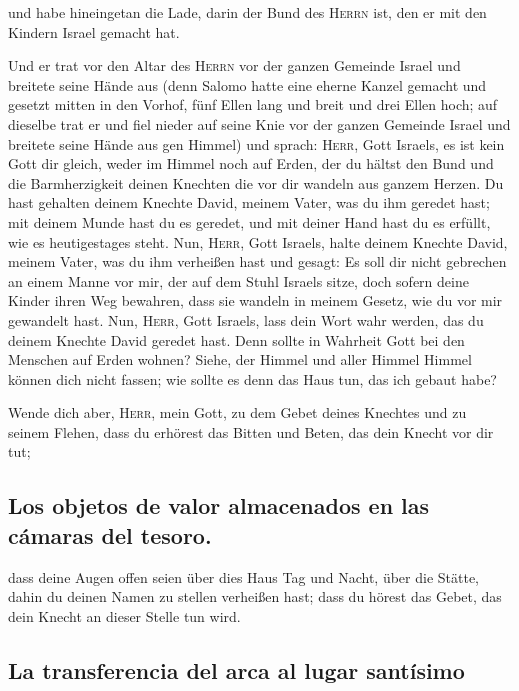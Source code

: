  und habe hineingetan die Lade, darin der Bund des
\textsc{Herrn} ist, den er mit den Kindern Israel gemacht hat.

 Und er trat vor den Altar des \textsc{Herrn} vor der
ganzen Gemeinde Israel und breitete seine Hände aus 
(denn Salomo hatte eine eherne Kanzel gemacht und gesetzt mitten in den
Vorhof, fünf Ellen lang und breit und drei Ellen hoch; auf dieselbe trat
er und fiel nieder auf seine Knie vor der ganzen Gemeinde Israel und
breitete seine Hände aus gen Himmel)  und sprach:
\textsc{Herr}, Gott Israels, es ist kein Gott dir gleich, weder im
Himmel noch auf Erden, der du hältst den Bund und die Barmherzigkeit
deinen Knechten die vor dir wandeln aus ganzem Herzen. 
Du hast gehalten deinem Knechte David, meinem Vater, was du ihm geredet
hast; mit deinem Munde hast du es geredet, und mit deiner Hand hast du
es erfüllt, wie es heutigestages steht.  Nun,
\textsc{Herr}, Gott Israels, halte deinem Knechte David, meinem Vater,
was du ihm verheißen hast und gesagt: Es soll dir nicht gebrechen an
einem Manne vor mir, der auf dem Stuhl Israels sitze, doch sofern deine
Kinder ihren Weg bewahren, dass sie wandeln in meinem Gesetz, wie du vor
mir gewandelt hast.  Nun, \textsc{Herr}, Gott Israels,
lass dein Wort wahr werden, das du deinem Knechte David geredet hast.
 Denn sollte in Wahrheit Gott bei den Menschen auf Erden
wohnen? Siehe, der Himmel und aller Himmel Himmel können dich nicht
fassen; wie sollte es denn das Haus tun, das ich gebaut habe?

 Wende dich aber, \textsc{Herr}, mein Gott, zu dem Gebet
deines Knechtes und zu seinem Flehen, dass du erhörest das Bitten und
Beten, das dein Knecht vor dir tut;

\hypertarget{los-objetos-de-valor-almacenados-en-las-cuxe1maras-del-tesoro.}{%
\subsection{Los objetos de valor almacenados en las cámaras del
tesoro.}\label{los-objetos-de-valor-almacenados-en-las-cuxe1maras-del-tesoro.}}

 dass deine Augen offen seien über dies Haus Tag und
Nacht, über die Stätte, dahin du deinen Namen zu stellen verheißen hast;
dass du hörest das Gebet, das dein Knecht an dieser Stelle tun wird.

\hypertarget{la-transferencia-del-arca-al-lugar-santuxedsimo}{%
\subsection{La transferencia del arca al lugar
santísimo}\label{la-transferencia-del-arca-al-lugar-santuxedsimo}}

